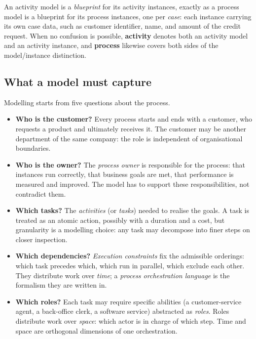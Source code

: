 An activity model is a \emph{blueprint} for its activity instances, exactly as a process model is a blueprint for its process instances, one per \emph{case}: each instance carrying its own case data, such as customer identifier, name, and amount of the credit request. When no confusion is possible, \textbf{activity} denotes both an activity model and an activity instance, and \textbf{process} likewise covers both sides of the model/instance distinction.

\subsection{What a model must capture}

Modelling starts from five questions about the process.

\begin{itemize}
  \item \textbf{Who is the customer?} Every process starts and ends with a customer, who requests a product and ultimately receives it. The customer may be another department of the same company: the role is independent of organisational boundaries.
  \item \textbf{Who is the owner?} The \emph{process owner} is responsible for the process: that instances run correctly, that business goals are met, that performance is measured and improved. The model has to support these responsibilities, not contradict them.
  \item \textbf{Which tasks?} The \emph{activities} (or \emph{tasks}) needed to realise the goals. A task is treated as an atomic action, possibly with a duration and a cost, but granularity is a modelling choice: any task may decompose into finer steps on closer inspection.
  \item \textbf{Which dependencies?} \emph{Execution constraints} fix the admissible orderings: which task precedes which, which run in parallel, which exclude each other. They distribute work over \emph{time}; a \emph{process orchestration language} is the formalism they are written in.
  \item \textbf{Which roles?} Each task may require specific abilities (a customer-service agent, a back-office clerk, a software service) abstracted as \emph{roles}. Roles distribute work over \emph{space}: which actor is in charge of which step. Time and space are orthogonal dimensions of one orchestration.
\end{itemize}

